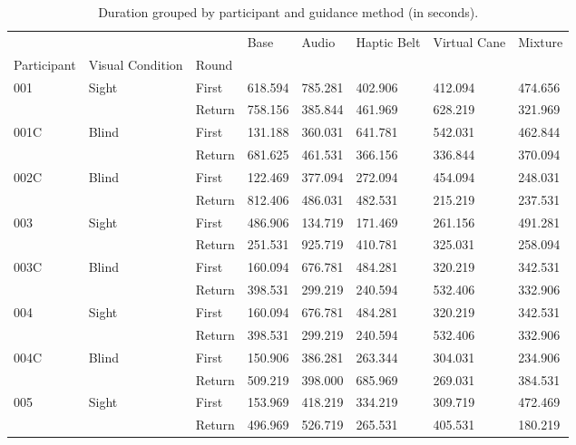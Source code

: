 
\begin{table}[!htb]
\centering
\caption{Duration grouped by participant and guidance method (in seconds).}
\label{tab:duracao_average_sec}
\begin{tabular}{llllllll}
\toprule
    &       &        &    Base &   Audio & Haptic Belt & Virtual Cane & Mixture \\
Participant & Visual Condition & Round &         &         &             &              &         \\
\midrule
001 & Sight & First & 618.594 & 785.281 &     402.906 &      412.094 & 474.656 \\
    &       & Return & 758.156 & 385.844 &     461.969 &      628.219 & 321.969 \\
001C & Blind & First & 131.188 & 360.031 &     641.781 &      542.031 & 462.844 \\
    &       & Return & 681.625 & 461.531 &     366.156 &      336.844 & 370.094 \\
002C & Blind & First & 122.469 & 377.094 &     272.094 &      454.094 & 248.031 \\
    &       & Return & 812.406 & 486.031 &     482.531 &      215.219 & 237.531 \\
003 & Sight & First & 486.906 & 134.719 &     171.469 &      261.156 & 491.281 \\
    &       & Return & 251.531 & 925.719 &     410.781 &      325.031 & 258.094 \\
003C & Blind & First & 160.094 & 676.781 &     484.281 &      320.219 & 342.531 \\
    &       & Return & 398.531 & 299.219 &     240.594 &      532.406 & 332.906 \\
004 & Sight & First & 160.094 & 676.781 &     484.281 &      320.219 & 342.531 \\
    &       & Return & 398.531 & 299.219 &     240.594 &      532.406 & 332.906 \\
004C & Blind & First & 150.906 & 386.281 &     263.344 &      304.031 & 234.906 \\
    &       & Return & 509.219 & 398.000 &     685.969 &      269.031 & 384.531 \\
005 & Sight & First & 153.969 & 418.219 &     334.219 &      309.719 & 472.469 \\
    &       & Return & 496.969 & 526.719 &     265.531 &      405.531 & 180.219 \\
\bottomrule
\end{tabular}
\end{table}

